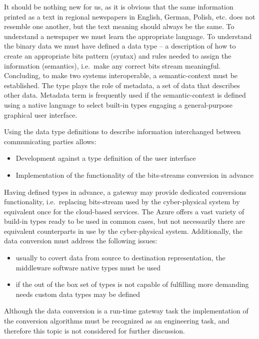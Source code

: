 \documentclass[
]{article}
\providecommand{\tightlist}{%
  \setlength{\itemsep}{0pt}\setlength{\parskip}{0pt}}
\begin{document}
It should be nothing new for us, as it is obvious that the same
information printed as a text in regional newspapers in English, German,
Polish, etc. does not resemble one another, but the text meaning should
always be the same. To understand a newspaper we must learn the
appropriate language. To understand the binary data we must have defined
a data type -- a description of how to create an appropriate bits
pattern (syntax) and rules needed to assign the information (semantics),
i.e.~make any correct bits stream meaningful. Concluding, to make two
systems interoperable, a semantic-context must be established. The type
plays the role of metadata, a set of data that describes other data.
Metadata term is frequently used if the semantic-context is defined
using a native language to select built-in types engaging a
general-purpose graphical user interface.

Using the data type definitions to describe information interchanged
between communicating parties allows:

\begin{itemize}
\tightlist
\item
  Development against a type definition of the user interface
\item
  Implementation of the functionality of the bits-streams conversion in
  advance
\end{itemize}

Having defined types in advance, a gateway may provide dedicated
conversions functionality, i.e.~replacing bits-stream used by the
cyber-physical system by equivalent once for the cloud-based services.
The Azure offers a vast variety of build-in types ready to be used in
common cases, but not necessarily there are equivalent counterparts in
use by the cyber-physical system. Additionally, the data conversion must
address the following issues:

\begin{itemize}
\tightlist
\item
  usually to covert data from source to destination representation, the
  middleware software native types must be used
\item
  if the out of the box set of types is not capable of fulfilling more
  demanding needs custom data types may be defined
\end{itemize}

Although the data conversion is a run-time gateway task the
implementation of the conversion algorithms must be recognized as an
engineering task, and therefore this topic is not considered for further
discussion.
\end{document}
